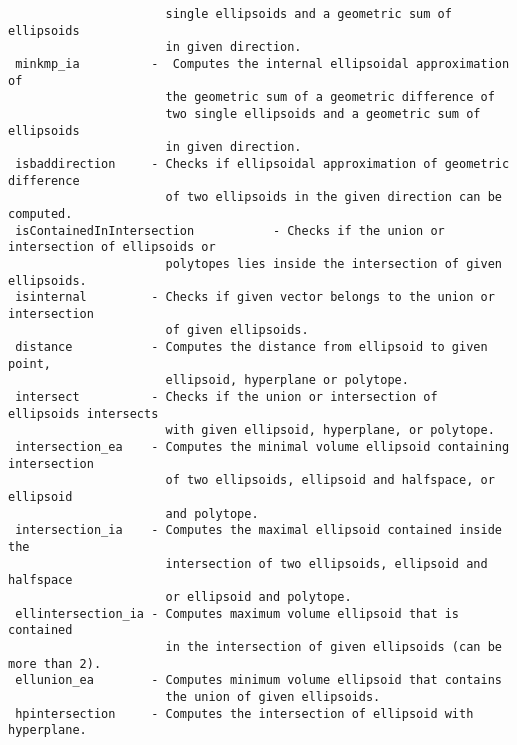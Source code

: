 \begin{verbatim}
                      single ellipsoids and a geometric sum of ellipsoids
                      in given direction.
 minkmp_ia          -  Computes the internal ellipsoidal approximation of
                      the geometric sum of a geometric difference of
                      two single ellipsoids and a geometric sum of ellipsoids
                      in given direction.
 isbaddirection     - Checks if ellipsoidal approximation of geometric difference
                      of two ellipsoids in the given direction can be computed.
 isContainedInIntersection           - Checks if the union or intersection of ellipsoids or
                      polytopes lies inside the intersection of given ellipsoids.
 isinternal         - Checks if given vector belongs to the union or intersection
                      of given ellipsoids.
 distance           - Computes the distance from ellipsoid to given point,
                      ellipsoid, hyperplane or polytope.
 intersect          - Checks if the union or intersection of ellipsoids intersects
                      with given ellipsoid, hyperplane, or polytope.
 intersection_ea    - Computes the minimal volume ellipsoid containing intersection
                      of two ellipsoids, ellipsoid and halfspace, or ellipsoid
                      and polytope.
 intersection_ia    - Computes the maximal ellipsoid contained inside the
                      intersection of two ellipsoids, ellipsoid and halfspace
                      or ellipsoid and polytope.
 ellintersection_ia - Computes maximum volume ellipsoid that is contained
                      in the intersection of given ellipsoids (can be more than 2).
 ellunion_ea        - Computes minimum volume ellipsoid that contains
                      the union of given ellipsoids.
 hpintersection     - Computes the intersection of ellipsoid with hyperplane.
\end{verbatim}
